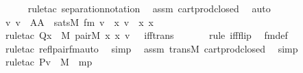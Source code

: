 \begin{isabellebody}
\ \ \ \ \isamarkupfalse%
\ {\isacharparenleft}{\kern0pt}rule{\isacharunderscore}{\kern0pt}tac\ separation{\isacharunderscore}{\kern0pt}notation{\isacharparenright}{\kern0pt}\ \isamarkupfalse%
\ assm\ cartprod{\isacharunderscore}{\kern0pt}closed\ \isamarkupfalse%
\ auto\ \isamarkupfalse%
\ \isanewline
\ \ \isanewline
\ \ \isamarkupfalse%
\ {\isachardoublequoteopen}{\isasymAnd}v{\isachardot}{\kern0pt}\ v\ {\isasymin}\ A{\isasymtimes}A\ {\isasymLongrightarrow}\ sats{\isacharparenleft}{\kern0pt}M{\isacharcomma}{\kern0pt}\ fm{\isacharcomma}{\kern0pt}\ {\isacharbrackleft}{\kern0pt}v{\isacharbrackright}{\kern0pt}{\isacharat}{\kern0pt}{\isacharbrackleft}{\kern0pt}{\isacharbrackright}{\kern0pt}{\isacharparenright}{\kern0pt}\ {\isasymlongleftrightarrow}\ {\isacharparenleft}{\kern0pt}{\isasymexists}x{\isachardot}{\kern0pt}\ v\ {\isacharequal}{\kern0pt}\ {\isacharless}{\kern0pt}x{\isacharcomma}{\kern0pt}\ x{\isachargreater}{\kern0pt}{\isacharparenright}{\kern0pt}{\isachardoublequoteclose}\isanewline
\ \ \ \ \isamarkupfalse%
\ {\isacharparenleft}{\kern0pt}rule{\isacharunderscore}{\kern0pt}tac\ Q{\isacharequal}{\kern0pt}{\isachardoublequoteopen}{\isacharparenleft}{\kern0pt}{\isasymexists}x\ {\isasymin}\ M{\isachardot}{\kern0pt}\ pair{\isacharparenleft}{\kern0pt}{\isacharhash}{\kern0pt}{\isacharhash}{\kern0pt}M{\isacharcomma}{\kern0pt}\ x{\isacharcomma}{\kern0pt}\ x{\isacharcomma}{\kern0pt}\ v{\isacharparenright}{\kern0pt}{\isacharparenright}{\kern0pt}\ {\isachardoublequoteclose}\ \ iff{\isacharunderscore}{\kern0pt}trans{\isacharparenright}{\kern0pt}\ \isanewline
\ \ \ \ \isamarkupfalse%
\ {\isacharparenleft}{\kern0pt}rule\ iff{\isacharunderscore}{\kern0pt}flip{\isacharparenright}{\kern0pt}\ \isamarkupfalse%
\ fm{\isacharunderscore}{\kern0pt}def\isanewline
\ \ \ \ \isamarkupfalse%
\ {\isacharparenleft}{\kern0pt}rule{\isacharunderscore}{\kern0pt}tac\ refl{\isacharunderscore}{\kern0pt}pair{\isacharunderscore}{\kern0pt}fm{\isacharunderscore}{\kern0pt}auto{\isacharparenright}{\kern0pt}\ \isamarkupfalse%
\ simp\ \isamarkupfalse%
\ assm\ transM\ cartprod{\isacharunderscore}{\kern0pt}closed\ \isamarkupfalse%
\ simp\ \isanewline
\ \ \ \ \isamarkupfalse%
\ {\isacharparenleft}{\kern0pt}rule{\isacharunderscore}{\kern0pt}tac\ P{\isacharequal}{\kern0pt}{\isachardoublequoteopen}v\ {\isasymin}\ M{\isachardoublequoteclose}\ \ mp{\isacharparenright}{\kern0pt}\ \isamarkupfalse%

\end{isabellebody}
